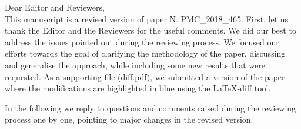 \documentclass[letterpaper, 10pt]{elsarticle}
\begin{document}
Dear Editor and Reviewers, \\

This manuscript is a revised version of paper N. PMC\_2018\_465.
First, let us thank the Editor and the Reviewers for the useful comments.
We did our best to address the issues pointed out during the reviewing process. 
We focused our efforts towards the goal of clarifying the methodology of the paper, discussing and generalise the approach, while including some new results that were requested.
As a supporting file (diff.pdf), we submitted a version of the paper where the modifications are highlighted in blue using the LaTeX-diff tool.

In the following we reply to questions and comments raised during the reviewing process one by one, pointing to major changes in the revised version.
\end{document}
